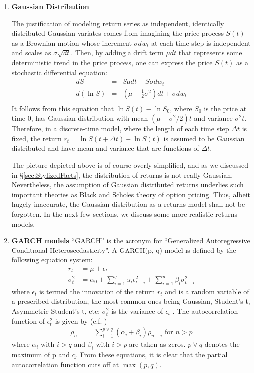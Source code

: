 \begin{enumerate}
\item{\bf Gaussian Distribution}

The justification of modeling return series as independent,
identically distributed Gaussian variates comes from imagining the
price process $S(t)$ as a Brownian motion whose increment $\sigma
dw_t$ at each time step is independent and scales as $\sigma
\sqrt{dt}$. Then, by adding a drift term $\mu dt$ that represents some
deterministic trend in the price process, one can express the
price $S(t)$ as a stochastic differential equation:
\begin{eqnarray*}
  dS &=& S\mu dt + S\sigma dw_t \\
  d(\ln S) &=& (\mu - \frac{1}{2} \sigma^2)dt + \sigma dw_t \\
\end{eqnarray*}
It follows from this equation that $\ln S(t) - \ln S_0$, where $S_0$
is the price at time 0, has Gaussian distribution with mean $(\mu -
\sigma^2/2)t$ and variance $\sigma^2 t$. Therefore, in a discrete-time
model, where the length of each time step $\Delta t$ is fixed, the
return $r_t = \ln S(t + \Delta t) - \ln S(t)$ is assumed to be
Gaussian distributed and have mean and variance that are functions of
$\Delta t$.

The picture depicted above is of course overly simplified, and as we
discussed in \S\ref{sec:StylizedFacts}, the distribution of returns is
not really Gaussian. Nevertheless, the assumption of Gaussian
distributed returns underlies such important theories as Black and
Scholes theory of option pricing. Thus, albeit hugely inaccurate, the
Gaussian distribution as a returns model shall not be forgotten. In
the next few sections, we discuss some more realistic returns models.

\item{\bf GARCH models}
``GARCH'' is the acronym for ``Generalized Autoregressive Conditional
Heteroscedasticity''. A GARCH(p, q) model is defined by the following
equation system:
\begin{equation}
  \label{eq:garch_def}
  \begin{aligned}
    r_t &= \mu + \epsilon_t \\
    \sigma_t^2 &= \alpha_0 + \sum_{i=1}^q \alpha_i \epsilon_{t-i}^2 +
    \sum_{i=1}^p \beta_i \sigma_{t-i}^2
  \end{aligned}
\end{equation}
where $\epsilon_t$ is termed the innovation of the return $r_t$ and is
a random variable of a prescribed distribution, the most common ones
being Gaussian, Student's t, Asymmetric Student's t, etc; $\sigma_t^2$
is the variance of $\epsilon_t$ \cite{Bollerslev86}. The
autocorrelation function of $\epsilon_t^2$ is given by
(c.f. \cite{Bollerslev87})
\begin{eqnarray*}
\rho_n &=& \sum_{i=1} ^{p \vee q} (\alpha_i + \beta_i) \rho_{n-i}
\text{ for $n > p$}
\end{eqnarray*}
where $\alpha_i$ with $i > q$ and $\beta_i$ with $i > p$ are taken as
zeros. $p \vee q$ denotes the maximum of p and q. From these
equations, it is clear that the partial autocorrelation function cuts
off at $\max(p, q)$.


\end{enumerate}
